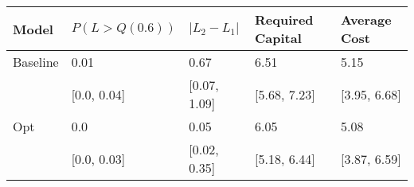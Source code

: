 \begin{tabular}{lllll}
\toprule
    Model & $P(L > Q(0.6))$ & $|L_2 - L_1|$ & Required Capital &  Average Cost \\
\midrule
 Baseline &            0.01 &          0.67 &             6.51 &          5.15 \\
          &     [0.0, 0.04] &  [0.07, 1.09] &     [5.68, 7.23] &  [3.95, 6.68] \\
      Opt &             0.0 &          0.05 &             6.05 &          5.08 \\
          &     [0.0, 0.03] &  [0.02, 0.35] &     [5.18, 6.44] &  [3.87, 6.59] \\
\bottomrule
\end{tabular}

